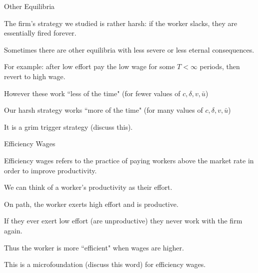 \documentclass[aspectratio=169,usenames,dvipsnames]{beamer}
\newenvironment{wideitemize}{\itemize\addtolength{\itemsep}{10pt}}{\enditemize}
\begin{document}
\begin{frame}{Other Equilibria}

\begin{wideitemize}
    \item The firm's strategy we studied is rather harsh: if the worker slacks, they are essentially fired forever.
    \item Sometimes there are other equilibria with less severe or less eternal consequences.
    \item For example: after low effort pay the low wage for some $T<\infty$ periods, then revert to high wage.
    \item However these work ``less of the time" (for fewer values of $c,\delta, v,\bar u$)
    \item Our harsh strategy works ``more of the time" (for many values of $c,\delta, v,\bar u$)
    \item It is a grim trigger strategy (discuss this).
\end{wideitemize}
    
\end{frame}

\begin{frame}{Efficiency Wages}
\begin{definition}
    Efficiency wages refers to the practice of paying workers above the market rate in order to improve productivity.
\end{definition}
\begin{wideitemize}
    \item We can think of a worker's productivity as their effort.
    \item On path, the worker exerts high effort and is productive.
    \item If they ever exert low effort (are unproductive) they never work with the firm again.
    \item Thus the worker is more ``efficient" when wages are higher.
    \item This is a microfoundation (discuss this word) for efficiency wages.
\end{wideitemize}
    
\end{frame}
\end{document}
